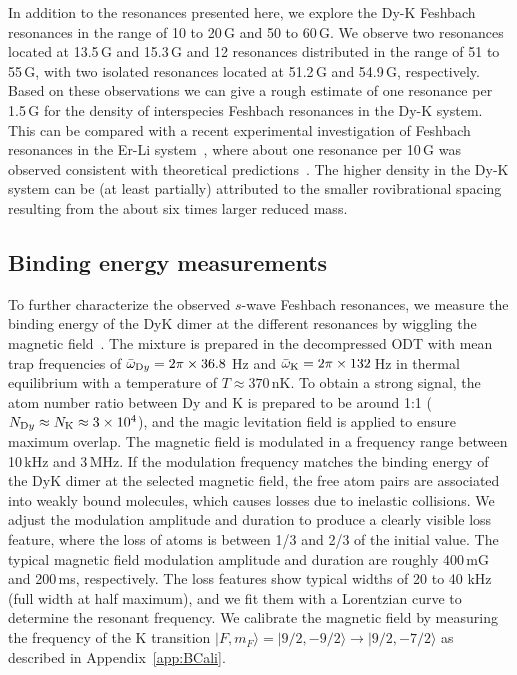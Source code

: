 In addition to the resonances presented here, we explore the Dy-K Feshbach resonances in the range of 10 to 20\,G and 50 to 60\,G. We observe two resonances located at 13.5\,G and 15.3\,G and 12 resonances distributed in the range of 51 to 55\,G, with two isolated resonances located at 51.2\,G and 54.9\,G, respectively. Based on these observations we can give a rough estimate of one resonance per 1.5\,G for the density of interspecies Feshbach resonances in the Dy-K system. This can be compared with a recent experimental investigation of Feshbach resonances in the Er-Li system~\cite{Schafer2022fro}, where about one resonance per 10\,G was observed consistent with theoretical predictions~\cite{Gonzalezmartinez2015mtf}. The higher density in the Dy-K system can be (at least partially) attributed to the smaller rovibrational spacing resulting from the about six times larger reduced mass.

\subsection{Binding energy measurements}
\label{sec:BEM}

To further characterize the observed $s$-wave Feshbach resonances, we measure the binding energy of the DyK dimer at the different resonances by wiggling the magnetic field~\cite{Chin2010fri,Claussen2003vhp}. The mixture is prepared in the decompressed ODT with mean trap frequencies of $\bar{\omega}_{\textrm Dy}=2\pi\times36.8$ Hz and $\bar{\omega}_{\textrm K}=2\pi\times132$\,Hz in thermal equilibrium with a temperature of $T\approx370$\,nK. To obtain a strong signal, the atom number ratio between Dy and K is prepared to be around 1:1 ($N_{\textrm Dy}\approx N_{\textrm K}\approx3\times10^4$), and the magic levitation field is applied to ensure maximum overlap. The magnetic field is modulated in a frequency range between 10\,kHz and 3\,MHz. If the modulation frequency matches the binding energy of the DyK dimer at the selected magnetic field, the free atom pairs are associated into weakly bound molecules, which causes losses due to inelastic collisions. We adjust the modulation amplitude and duration to produce a clearly visible loss feature, where the loss of atoms is between 1/3 and 2/3 of the initial value. The typical magnetic field modulation amplitude and duration are roughly 400\,mG and 200\,ms, respectively. The loss features show typical widths of 20 to 40 kHz (full width at half maximum), and we fit them with a Lorentzian curve to determine the resonant frequency. We calibrate the magnetic field by measuring the frequency of the K transition $|F,m_F\rangle =|9/2,-9/2\rangle \rightarrow |9/2,-7/2\rangle$ as described in Appendix~\ref{app:BCali}.


